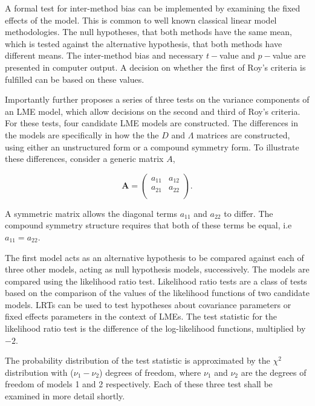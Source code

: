 \documentclass[12pt, a4paper]{report}
\theoremstyle{plain}
\theoremstyle{definition}
\theoremstyle{remark}
\begin{document}
A formal test for inter-method bias can be implemented by examining the fixed effects of the model. This is common to well known classical linear model methodologies. The null hypotheses, that both methods have the same mean, which is tested against the alternative hypothesis, that both methods have different means.
The inter-method bias and necessary $t-$value and $p-$value are presented in computer output. A decision on whether the first of Roy's criteria is fulfilled can be based on these values.

Importantly \citet{roy} further proposes a series of three tests on the variance components of an LME model, which allow decisions on the second and third of Roy's criteria. For these tests, four candidate LME models are constructed. The differences in the models are specifically in how the the $D$ and $\Lambda$ matrices are constructed, using either an unstructured form or a compound symmetry form. To illustrate these differences, consider a generic matrix $A$,

\[
\boldsymbol{A} = \left( \begin{array}{cc}
a_{11} & a_{12}  \\
a_{21} & a_{22}  \\
\end{array}\right).
\]

A symmetric matrix allows the diagonal terms $a_{11}$ and $a_{22}$ to differ. The compound symmetry structure requires that both of these terms be equal, i.e $a_{11} = a_{22}$.

The first model acts as an alternative hypothesis to be compared against each of three other models, acting as null hypothesis models, successively. The models are compared using the likelihood ratio test. Likelihood ratio tests are a class of tests based on the comparison of the values of the likelihood functions of two candidate models. LRTs can be used to test hypotheses about covariance parameters or fixed effects parameters in the context of LMEs. The test statistic for the likelihood ratio test is the difference of the log-likelihood functions, multiplied by $-2$.

The probability distribution of the test statistic is approximated by the $\chi^2$ distribution with ($\nu_{1} - \nu_{2}$) degrees of freedom, where $\nu_{1}$ and $\nu_{2}$ are the degrees of freedom of models 1 and 2 respectively. Each of these three test shall be examined in more detail shortly.
\end{document}
